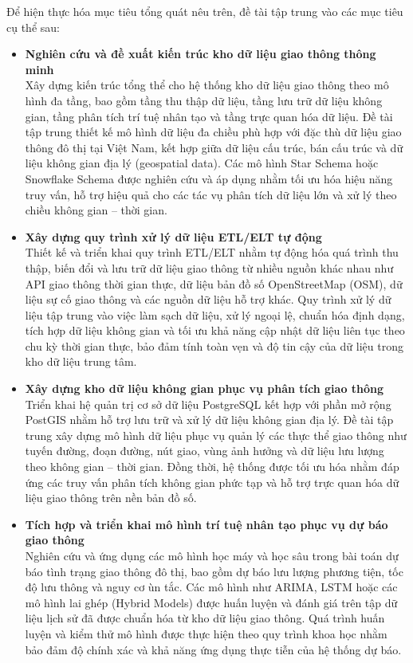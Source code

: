 Để hiện thực hóa mục tiêu tổng quát nêu trên, đề tài tập trung vào các mục tiêu cụ thể sau:

\begin{itemize}

    \item \textbf{Nghiên cứu và đề xuất kiến trúc kho dữ liệu giao thông thông minh}\\
    Xây dựng kiến trúc tổng thể cho hệ thống kho dữ liệu giao thông theo mô hình đa tầng, bao gồm tầng thu thập dữ liệu, tầng lưu trữ dữ liệu không gian, tầng phân tích trí tuệ nhân tạo và tầng trực quan hóa dữ liệu. Đề tài tập trung thiết kế mô hình dữ liệu đa chiều phù hợp với đặc thù dữ liệu giao thông đô thị tại Việt Nam, kết hợp giữa dữ liệu cấu trúc, bán cấu trúc và dữ liệu không gian địa lý (geospatial data). Các mô hình Star Schema hoặc Snowflake Schema được nghiên cứu và áp dụng nhằm tối ưu hóa hiệu năng truy vấn, hỗ trợ hiệu quả cho các tác vụ phân tích dữ liệu lớn và xử lý theo chiều không gian – thời gian.

    \item \textbf{Xây dựng quy trình xử lý dữ liệu ETL/ELT tự động}\\
    Thiết kế và triển khai quy trình ETL/ELT nhằm tự động hóa quá trình thu thập, biến đổi và lưu trữ dữ liệu giao thông từ nhiều nguồn khác nhau như API giao thông thời gian thực, dữ liệu bản đồ số OpenStreetMap (OSM), dữ liệu sự cố giao thông và các nguồn dữ liệu hỗ trợ khác. Quy trình xử lý dữ liệu tập trung vào việc làm sạch dữ liệu, xử lý ngoại lệ, chuẩn hóa định dạng, tích hợp dữ liệu không gian và tối ưu khả năng cập nhật dữ liệu liên tục theo chu kỳ thời gian thực, bảo đảm tính toàn vẹn và độ tin cậy của dữ liệu trong kho dữ liệu trung tâm.

    \item \textbf{Xây dựng kho dữ liệu không gian phục vụ phân tích giao thông}\\
    Triển khai hệ quản trị cơ sở dữ liệu PostgreSQL kết hợp với phần mở rộng PostGIS nhằm hỗ trợ lưu trữ và xử lý dữ liệu không gian địa lý. Đề tài tập trung xây dựng mô hình dữ liệu phục vụ quản lý các thực thể giao thông như tuyến đường, đoạn đường, nút giao, vùng ảnh hưởng và dữ liệu lưu lượng theo không gian – thời gian. Đồng thời, hệ thống được tối ưu hóa nhằm đáp ứng các truy vấn phân tích không gian phức tạp và hỗ trợ trực quan hóa dữ liệu giao thông trên nền bản đồ số.

    \item \textbf{Tích hợp và triển khai mô hình trí tuệ nhân tạo phục vụ dự báo giao thông}\\
    Nghiên cứu và ứng dụng các mô hình học máy và học sâu trong bài toán dự báo tình trạng giao thông đô thị, bao gồm dự báo lưu lượng phương tiện, tốc độ lưu thông và nguy cơ ùn tắc. Các mô hình như ARIMA, LSTM hoặc các mô hình lai ghép (Hybrid Models) được huấn luyện và đánh giá trên tập dữ liệu lịch sử đã được chuẩn hóa từ kho dữ liệu giao thông. Quá trình huấn luyện và kiểm thử mô hình được thực hiện theo quy trình khoa học nhằm bảo đảm độ chính xác và khả năng ứng dụng thực tiễn của hệ thống dự báo.


\end{itemize}
